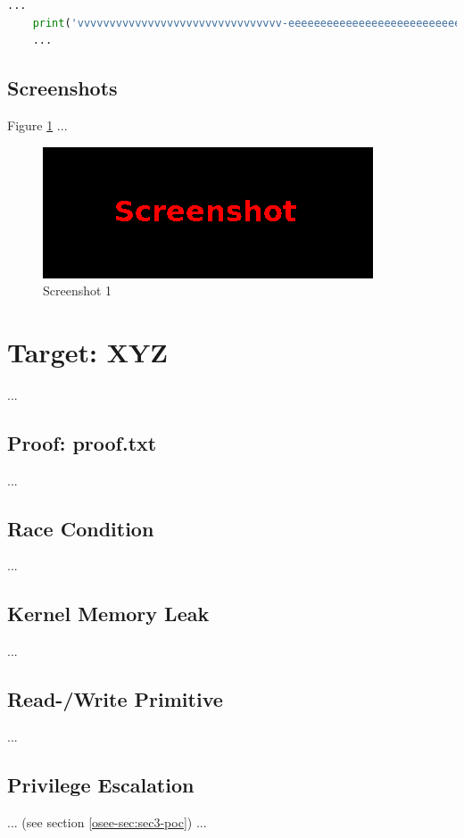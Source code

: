 \begin{lstlisting}[language=Python,caption={Proof of Concept}, label={osee-lst:sec2-poc}]
    ...
    print('vvvvvvvvvvvvvvvvvvvvvvvvvvvvvvvv-eeeeeeeeeeeeeeeeeeeeeeeeeeeeeeeeeeeeeeeeeee-looooooooooooooooooooooong-striiiiiiiiiiiiiing')
    ...
\end{lstlisting}
%
%
%
\subsection{Screenshots}\label{osee-sec:sec2-screens}
%
Figure \ref{osee-fig:sec2-screen1} ...

\begin{figure}[H]
    \centering
    \includegraphics[width=\textwidth]{img/assignment1/screen1.png}
    \caption{Screenshot 1}\label{osee-fig:sec2-screen1}
\end{figure}
%
%
%
\section{Target: XYZ}\label{osee-sec:sec3}
%
...
%
%
%
\subsection{Proof: proof.txt}\label{osee-sec:sec3-proof}
%
...
%
%
%
\subsection{Race Condition}\label{osee-sec:sec3-race}
%
...
%
%
%
\subsection{Kernel Memory Leak}\label{osee-sec:sec3-leak}
%
...
%
%
%
\subsection{Read-/Write Primitive}\label{osee-sec:sec3-rwprim}
%
...
%
%
%
\subsection{Privilege Escalation}\label{osee-sec:sec3-privescal}
%
... (see section \ref{osee-sec:sec3-poc}) ...
%
%
%
